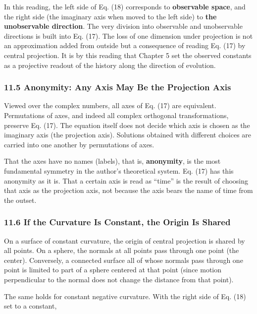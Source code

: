 \documentclass[
  a4paper,
]{article}
\begin{document}
In this reading, the left side of Eq. (18) corresponds to
\textbf{observable space}, and the right side (the imaginary axis when
moved to the left side) to \textbf{the unobservable direction}. The very
division into observable and unobservable directions is built into Eq.
(17). The loss of one dimension under projection is not an approximation
added from outside but a consequence of reading Eq. (17) by central
projection. It is by this reading that Chapter 5 set the observed
constants as a projective readout of the history along the direction of
evolution.

\subsubsection{11.5 Anonymity: Any Axis May Be the Projection
Axis}\label{anonymity-any-axis-may-be-the-projection-axis}

Viewed over the complex numbers, all axes of Eq. (17) are equivalent.
Permutations of axes, and indeed all complex orthogonal transformations,
preserve Eq. (17). The equation itself does not decide which axis is
chosen as the imaginary axis (the projection axis). Solutions obtained
with different choices are carried into one another by permutations of
axes.

That the axes have no names (labels), that is, \textbf{anonymity}, is
the most fundamental symmetry in the author's theoretical system. Eq.
(17) has this anonymity as it is. That a certain axis is read as
``time'' is the result of choosing that axis as the projection axis, not
because the axis bears the name of time from the outset.

\subsubsection{11.6 If the Curvature Is Constant, the Origin Is
Shared}\label{if-the-curvature-is-constant-the-origin-is-shared}

On a surface of constant curvature, the origin of central projection is
shared by all points. On a sphere, the normals at all points pass
through one point (the center). Conversely, a connected surface all of
whose normals pass through one point is limited to part of a sphere
centered at that point (since motion perpendicular to the normal does
not change the distance from that point).

The same holds for constant negative curvature. With the right side of
Eq. (18) set to a constant,
\end{document}
